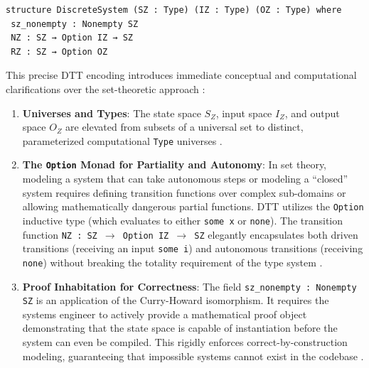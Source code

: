 \documentclass[11pt]{article}
\begin{document}
\begin{verbatim}
structure DiscreteSystem (SZ : Type) (IZ : Type) (OZ : Type) where
 sz_nonempty : Nonempty SZ
 NZ : SZ → Option IZ → SZ
 RZ : SZ → Option OZ
\end{verbatim}

This precise DTT encoding introduces immediate conceptual and computational clarifications over the set-theoretic approach \parencite{Ref27}:
\begin{enumerate}
 \item \textbf{Universes and Types}: The state space $S_Z$, input space $I_Z$, and output space $O_Z$ are elevated from subsets of a universal set to distinct, parameterized computational \texttt{Type} universes \parencite{Ref27}.\item \textbf{The \texttt{Option} Monad for Partiality and Autonomy}: In set theory, modeling a system that can take autonomous steps or modeling a ``closed'' system requires defining transition functions over complex sub-domains or allowing mathematically dangerous partial functions. DTT utilizes the \texttt{Option} inductive type (which evaluates to either \texttt{some x} or \texttt{none}). The transition function \texttt{NZ : SZ $\to$ Option IZ $\to$ SZ} elegantly encapsulates both driven transitions (receiving an input \texttt{some i}) and autonomous transitions (receiving \texttt{none}) without breaking the totality requirement of the type system \parencite{Ref27}.\item \textbf{Proof Inhabitation for Correctness}: The field \texttt{sz\_nonempty : Nonempty SZ} is an application of the Curry-Howard isomorphism. It requires the systems engineer to actively provide a mathematical proof object demonstrating that the state space is capable of instantiation before the system can even be compiled. This rigidly enforces correct-by-construction modeling, guaranteeing that impossible systems cannot exist in the codebase \parencite{Ref27, Ref39, Ref40}.\end{enumerate}
\end{document}
